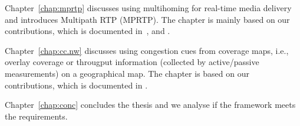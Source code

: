 Chapter~\ref{chap:mprtp} discusses using multihoming for real-time media delivery
and introduces Multipath RTP (MPRTP). The chapter is mainly based on our
contributions, which is documented in~\cite{draft.mprtp, draft.mprtp.sdp,
Globisch:AsymGrpComm, draft.rtcp.overlay}, and .


Chapter~\ref{chap:cc.nw} discusses using congestion cues from coverage maps, i.e.,
overlay coverage or througput information (collected by active/passive
measurements) on a geographical map. The chapter is based on our
contributions,  which is documented in .


Chapter~\ref{chap:conc} concludes the thesis and we analyse if the framework meets
the requirements.
